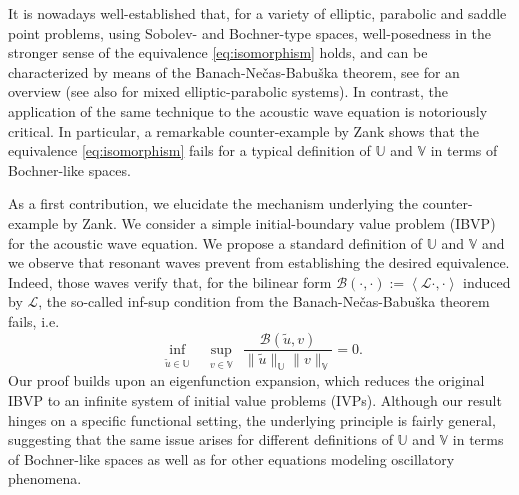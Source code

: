 \documentclass{amsart}
\theoremstyle{plain}
\theoremstyle{remark}
\numberwithin{equation}{section}
\numberwithin{theorem}{section}
\newcommand{\trial}{\mathbb{U}}
\newcommand{\test}{\mathbb{V}}
\begin{document}
It is nowadays well-established that,  for a variety of elliptic, parabolic and saddle point problems, using Sobolev- and Bochner-type spaces,  well-posedness in the stronger sense of the equivalence \eqref{eq:isomorphism} holds, and can be characterized by means of the  Banach-Ne\v{c}as-Babu\v{s}ka theorem, see \cite{Ern.Guermond:21-II, Ern.Guermond:21-III} for an overview (see also \cite{Kreuzer.Zanotti:24a} for mixed elliptic-parabolic systems). In contrast, the application of the same technique to the acoustic wave equation is notoriously critical. In particular, a remarkable counter-example by Zank \cite{Zank:20} shows that the equivalence \eqref{eq:isomorphism} fails for a typical definition of $\trial$ and $\test$ in terms of Bochner-like spaces. 

As a first contribution, we elucidate the mechanism underlying the counter-example by Zank. We consider a simple initial-boundary value problem (IBVP) for the acoustic wave equation. We propose a standard definition of $\trial$ and $\test$ and we observe that resonant waves prevent from establishing the desired equivalence. Indeed, those waves verify that, for the bilinear form $\mathcal{B}(\cdot, \cdot) := \left\langle \mathcal{L}\cdot, \cdot\right\rangle  $ induced by $\mathcal{L}$, the so-called inf-sup condition from the Banach-Ne\v{c}as-Babu\v{s}ka theorem fails, i.e.
\begin{equation}
\label{eq:inf-sup-failure}
		\inf_{\substack{\widetilde u \in \trial}}\,\,\sup _{\substack{v \in \test}} \,\frac{\mathcal{B}(\widetilde u,v)}{\|\widetilde u\|_\trial\|v\|_\test} = 0. 
\end{equation}
Our proof builds upon an eigenfunction expansion, which reduces the original IBVP to an infinite system of initial value problems (IVPs). Although our result hinges on a specific functional setting, the underlying principle is fairly general, suggesting that the same issue arises for different definitions of $\trial$ and $\test$ in terms of Bochner-like spaces as well as for other equations modeling oscillatory phenomena.  
\end{document}
